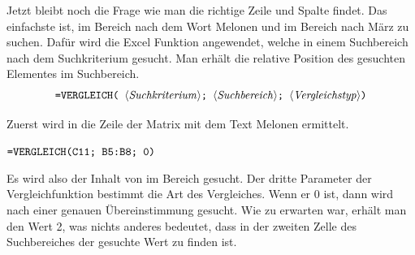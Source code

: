 Jetzt bleibt noch die Frage wie man die richtige Zeile und Spalte findet. Das einfachste ist, im Bereich  nach dem Wort Melonen und im Bereich  nach März zu suchen. Dafür wird die Excel Funktion  angewendet, welche in einem Suchbereich nach dem Suchkriterium gesucht. Man erhält die relative Position des gesuchten Elementes im Suchbereich.%
$$ \text{ \stmt{=VERGLEICH( \syntax{Suchkriterium}; \syntax{Suchbereich}; \syntax{Vergleichstyp})} }$$


\begin{figwindow}
Zuerst wird in  die Zeile der Matrix  mit dem Text Melonen ermittelt.

$ \text{\texttt{=VERGLEICH(C11; B5:B8; 0)}} $

Es wird also der Inhalt von  im Bereich  gesucht. Der dritte Parameter der Vergleichfunktion bestimmt die Art des Vergleiches. Wenn er 0 ist, dann wird nach einer genauen Übereinstimmung gesucht. Wie zu erwarten war, erhält man den Wert 2, was nichts anderes bedeutet, dass in der zweiten Zelle des Suchbereiches der gesuchte Wert zu finden ist.%
\end{figwindow} 

